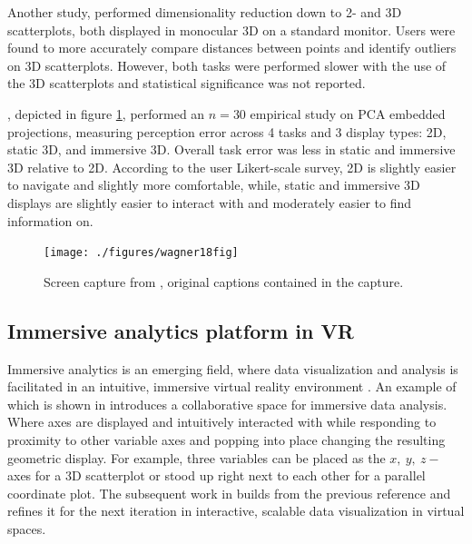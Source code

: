 \documentclass{template/monashthesis}
\begin{document}
Another study, \textcite{gracia_new_2016} performed dimensionality reduction down to 2- and 3D scatterplots, both displayed in monocular 3D on a standard monitor. Users were found to more accurately compare distances between points and identify outliers on 3D scatterplots. However, both tasks were performed slower with the use of the 3D scatterplots and statistical significance was not reported.

\textcite{wagner_filho_immersive_2018}, depicted in figure \ref{fig:wagner18fig}, performed an \(n=30\) empirical study on PCA embedded projections, measuring perception error across 4 tasks and 3 display types: 2D, static 3D, and immersive 3D. Overall task error was less in static and immersive 3D relative to 2D. According to the user Likert-scale survey, 2D is slightly easier to navigate and slightly more comfortable, while, static and immersive 3D displays are slightly easier to interact with and moderately easier to find information on.



\begin{figure}

{\centering \texttt{[image: ./figures/wagner18fig]} 

}

\caption{Screen capture from \textcite{wagner_filho_immersive_2018}, original captions contained in the capture.}\label{fig:wagner18fig}
\end{figure}

\hypertarget{immersive-analytics-platform-in-vr}{%
\subsection{Immersive analytics platform in VR}\label{immersive-analytics-platform-in-vr}}

Immersive analytics is an emerging field, where data visualization and analysis is facilitated in an intuitive, immersive virtual reality environment \autocite{chandler_immersive_2015,cordeil_immersive_2017}. An example of which is shown in \textcite{cordeil_imaxes:_2017} introduces a collaborative space for immersive data analysis. Where axes are displayed and intuitively interacted with while responding to proximity to other variable axes and popping into place changing the resulting geometric display. For example, three variables can be placed as the \(x,~y,~z-\) axes for a 3D scatterplot or stood up right next to each other for a parallel coordinate plot. The subsequent work in \textcite{cordeil_iatk:_2019} builds from the previous reference and refines it for the next iteration in interactive, scalable data visualization in virtual spaces.
\end{document}
